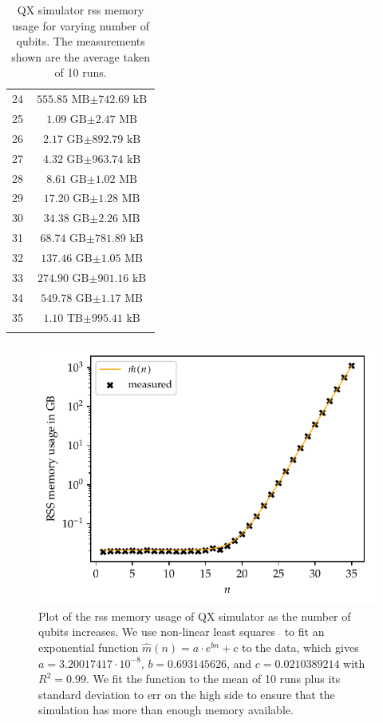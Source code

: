 \begin{table}[H]
\begin{tabular}{cc}
        24 & $\text{555.85 MB} \pm \text{742.69 kB}$ \\
        25 & $\text{1.09 GB} \pm \text{2.47 MB}$ \\
        26 & $\text{2.17 GB} \pm \text{892.79 kB}$ \\
        27 & $\text{4.32 GB} \pm \text{963.74 kB}$ \\
        28 & $\text{8.61 GB} \pm \text{1.02 MB}$ \\
        29 & $\text{17.20 GB} \pm \text{1.28 MB}$ \\
        30 & $\text{34.38 GB} \pm \text{2.26 MB}$ \\
        31 & $\text{68.74 GB} \pm \text{781.89 kB}$ \\
        32 & $\text{137.46 GB} \pm \text{1.05 MB}$ \\
        33 & $\text{274.90 GB} \pm \text{901.16 kB}$ \\
        34 & $\text{549.78 GB} \pm \text{1.17 MB}$ \\
        35 & $\text{1.10 TB} \pm \text{995.41 kB}$ \\
        \phantom{36} & \\
    \end{tabular}
    \caption[QX simulator \gls{rss} memory usage for varying number of qubits.]{
        QX simulator \gls{rss} memory usage for varying number of qubits.
        The measurements shown are the average taken of 10 runs.
    }
    \label{table:qx-memory-usage}
\end{table}

\begin{figure}[ht]
    \centering
    \includegraphics[width=0.765\linewidth]{figures/qx_memory_plot.pdf}
    
    \caption[Plot of the \gls{rss} memory usage of QX simulator as the number of qubits increases.]{
        Plot of the \gls{rss} memory usage of QX simulator as the number of qubits increases.
        We use non-linear least squares~\cite{branch1999subspace} to fit an exponential function $\hat{m}(n) = a \cdot e^{bn} + c$ to the data, which gives $a = 3.20017417 \cdot 10^{-8}$, $b = 0.693145626$, and $c = 0.0210389214$ with $R^2 = 0.99$.
        We fit the function to the mean of 10 runs plus its standard deviation to err on the high side to ensure that the simulation has more than enough memory available.
    }
    \label{fig:qx-memory-plot}
\end{figure}